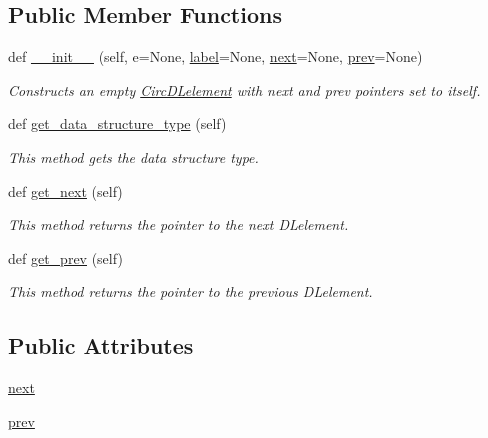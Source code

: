 \subsection*{Public Member Functions}
\begin{DoxyCompactItemize}
\item 
def \mbox{\hyperlink{classbridges_1_1circ__dl__element_1_1_circ_d_lelement_a13ff6ca8a1b7e88cb986547c68d8fc00}{\+\_\+\+\_\+init\+\_\+\+\_\+}} (self, e=None, \mbox{\hyperlink{classbridges_1_1element_1_1_element_a97551dbb005cd5d1f13b65461290c6e3}{label}}=None, \mbox{\hyperlink{classbridges_1_1circ__dl__element_1_1_circ_d_lelement_a0f01f7ff433628bac241d7c069a476fa}{next}}=None, \mbox{\hyperlink{classbridges_1_1circ__dl__element_1_1_circ_d_lelement_a78ed845303a07e303bcbb39f015843d0}{prev}}=None)
\begin{DoxyCompactList}\small\item\em Constructs an empty \mbox{\hyperlink{classbridges_1_1circ__dl__element_1_1_circ_d_lelement}{Circ\+D\+Lelement}} with next and prev pointers set to itself. \end{DoxyCompactList}\item 
def \mbox{\hyperlink{classbridges_1_1circ__dl__element_1_1_circ_d_lelement_ac33a5699a662730bb6f292654e6896dc}{get\+\_\+data\+\_\+structure\+\_\+type}} (self)
\begin{DoxyCompactList}\small\item\em This method gets the data structure type. \end{DoxyCompactList}\item 
def \mbox{\hyperlink{classbridges_1_1circ__dl__element_1_1_circ_d_lelement_a7a0432dd9694cb389db12a0027af04cc}{get\+\_\+next}} (self)
\begin{DoxyCompactList}\small\item\em This method returns the pointer to the next D\+Lelement. \end{DoxyCompactList}\item 
def \mbox{\hyperlink{classbridges_1_1circ__dl__element_1_1_circ_d_lelement_ab22f5daaddd55928455e0d85e88a6c03}{get\+\_\+prev}} (self)
\begin{DoxyCompactList}\small\item\em This method returns the pointer to the previous D\+Lelement. \end{DoxyCompactList}\end{DoxyCompactItemize}
\subsection*{Public Attributes}
\begin{DoxyCompactItemize}
\item 
\mbox{\hyperlink{classbridges_1_1circ__dl__element_1_1_circ_d_lelement_a0f01f7ff433628bac241d7c069a476fa}{next}}
\item 
\mbox{\hyperlink{classbridges_1_1circ__dl__element_1_1_circ_d_lelement_a78ed845303a07e303bcbb39f015843d0}{prev}}
\end{DoxyCompactItemize}
